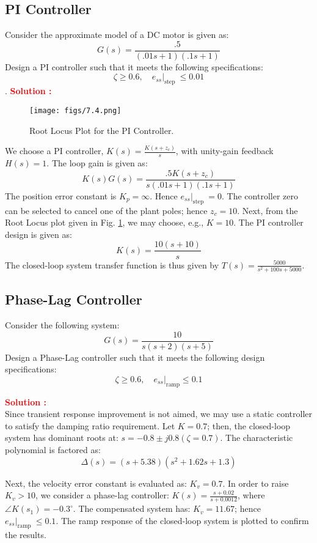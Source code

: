 \documentclass[12pt]{article}
\begin{document}
\subsection{PI Controller}

 Consider the approximate model of a DC motor is given as: $$G(s)=\frac{.5}{(.01 s+1)(.1 s+1)}$$
 Design a PI controller such that it meets the following specifications: $$\zeta \geq 0.6,\left.\quad e_{s s}\right|_{\text {step }} \leq 0.01$$.
 \textbf{\textcolor{red}{Solution :}} \\
 \begin{figure}[h!]
     \centering
     \texttt{[image: figs/7.4.png]}
     \caption{Root Locus Plot for the PI Controller.}
     \label{fig:prb19}
 \end{figure}
We choose a PI controller, $K(s)=\frac{K\left(s+z_c\right)}{s}$, with unity-gain feedback $H(s)=1$. The loop gain is given as: 
$$K(s) G(s)=\frac{.5 K\left(s+z_c\right)}{s(.01 s+1)(.1 s+1)}$$
The position error constant is $K_p=\infty$. Hence $\left.e_{s s}\right|_{\text {step }}=0$.
The controller zero can be selected to cancel one of the plant poles; hence $z_c=10$. Next, from the Root Locus plot given in Fig. \ref{fig:prb19}, we may choose, e.g., $K=10$. The PI controller design is given as: $$K(s)=\frac{10(s+10)}{s}$$
The closed-loop system transfer function is thus given by $T(s)=\frac{5000}{s^2+100 s+5000}$. 

\clearpage

\subsection{Phase-Lag Controller}

Consider the following system:
$$G(s)=\frac{10}{s(s+2)(s+5)}$$ 
Design a Phase-Lag controller such that it meets the following design specifications: 
$$\zeta \geq 0.6,\left.\quad e_{s s}\right|_{\mathrm{ramp}} \leq 0.1$$

\textbf{\textcolor{red}{Solution :}} \\
Since transient response improvement is not aimed, we may use a static controller to satisfy the damping ratio requirement. Let $K=0.7$; then, the closed-loop system has dominant roots at: $s=-0.8 \pm j 0.8(\zeta=0.7)$. The characteristic polynomial is factored as: 
$$\Delta(s)=(s+5.38)\left(s^2+1.62 s+1.3\right)$$

Next, the velocity error constant is evaluated as: $K_v=0.7$. In order to raise $K_v>10$, we consider a phase-lag controller: $K(s)=\frac{s+0.02}{s+0.0012}$, where $\angle K\left(s_1\right)=-0.3^{\circ}$. The compensated system has: $K_v=11.67$; hence $\left.e_{s s}\right|_{\text {ramp }} \leq 0.1$. The ramp response of the closed-loop system is plotted to confirm the results.
\end{document}

